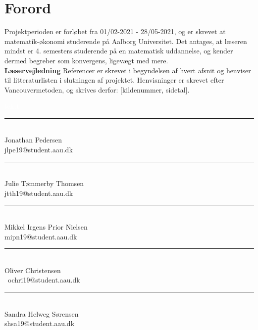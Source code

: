 \section*{Forord}


Projektperioden er forløbet fra 01/02-2021 - 28/05-2021, og er skrevet at matematik-økonomi studerende på Aalborg Universitet. Det antages, at læseren mindst er 4. semesters studerende på en matematisk uddannelse, og kender dermed begreber som konvergens, ligevægt med mere. \\

\large\textbf{Læservejledning} \normalsize \newline
Referencer er skrevet i begyndelsen af hvert afsnit og henviser til litteraturlisten i slutningen af projektet. Henvisninger er skrevet efter Vancouvermetoden, og skrives derfor: [kildenummer, sidetal].     %

\bigskip

\textcolor{white}{tekst}

\begin{minipage}[L]{0.45\textwidth}
 \centering
 \rule{\textwidth}{0.5pt}\\
  Jonathan Pedersen\\
 {\footnotesize jlpe19@student.aau.dk}
\end{minipage}
\hfill
\begin{minipage}[H]{0.45\textwidth}
 \centering
 \rule{\textwidth}{0.5pt}\\
  Julie Tømmerby Thomsen\\
 {\footnotesize jtth19@student.aau.dk}
\end{minipage}
\vspace{3\baselineskip}


\begin{minipage}[L]{0.45\textwidth}
 \centering
 \rule{\textwidth}{0.5pt}\\
 Mikkel Irgens Prior Nielsen\\
 {\footnotesize mipn19@student.aau.dk}
\end{minipage}
\hfill
\begin{minipage}[H]{0.45\textwidth}
 \centering
 \rule{\textwidth}{0.5pt}\\
  Oliver Christensen\\\
 {\footnotesize ochri19@student.aau.dk}
\end{minipage}
\vspace{3\baselineskip}


\begin{minipage}[H]{0.45\textwidth}
 \centering
 \rule{\textwidth}{0.5pt}\\
 Sandra Helweg Sørensen\\
 {\footnotesize shsa19@student.aau.dk}
\end{minipage}



